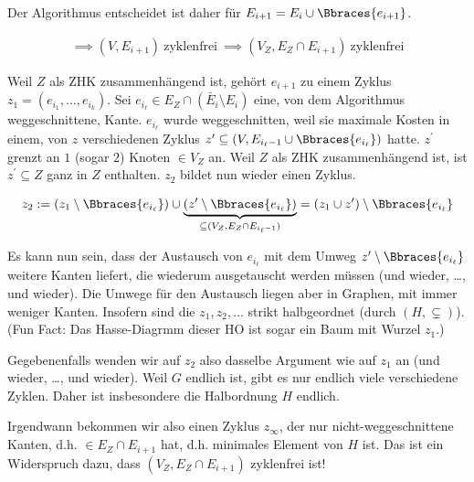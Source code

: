\begin{solution}
\begin{enumerate}[label = (\Alph*)]
\begin{enumerate}[label = \arabic*.]
\begin{enumerate}[label = 2.\arabic*.]
            Der Algorithmus entscheidet ist daher für $E_{i+1} = E_i \cup \Bbraces{e_{i+1}}$.

            \begin{align*}
                \implies
                (V, E_{i+1}) ~\text{zyklenfrei}~
                \implies
                (V_Z, E_Z \cap E_{i+1}) ~\text{zyklenfrei}
            \end{align*}

            Weil $Z$ als ZHK zusammenhängend ist, gehört $e_{i+1}$ zu einem Zyklus $z_1 = (e_{i_1}, \dots, e_{i_k})$.
            Sei $e_{i_\ell} \in E_Z \cap (\bar E_i \setminus E_i)$ eine, von dem Algorithmus weggeschnittene, Kante.
            $e_{i_\ell}$ wurde weggeschnitten, weil sie maximale Kosten in einem, von $z$ verschiedenen Zyklus $z^\prime \subseteq (V, E_{i_\ell - 1} \cup \Bbraces{e_{i_\ell}})$ hatte.
            $z^\prime$ grenzt an $1$ (sogar $2$) Knoten $\in V_Z$ an.
            Weil $Z$ als ZHK zusammenhängend ist, ist $z^\prime \subseteq Z$ ganz in $Z$ enthalten.
            $z_2$ bildet nun wieder einen Zyklus.

            \begin{align*}
                z_2
                :=
                (z_1      \setminus \Bbraces{e_{i_\ell}})
                \cup
                \underbrace
                {
                    (z^\prime \setminus \Bbraces{e_{i_\ell}})
                }_{
                    \subseteq (V_Z, E_Z \cap E_{i_\ell - 1})
                }
                =
                (z_1 \cup z^\prime) \setminus \Bbraces{e_{i_\ell}}
            \end{align*}

            Es kann nun sein, dass der Austausch von $e_{i_\ell}$ mit dem Umweg $z^\prime \setminus \Bbraces{e_{i_\ell}}$ weitere Kanten liefert, die wiederum ausgetauscht werden müssen (und wieder, \dots, und wieder).
            Die Umwege für den Austausch liegen aber in Graphen, mit immer weniger Kanten.
            Insofern sind die $z_1, z_2, \dots$ strikt halbgeordnet (durch $(H, \subsetneq)$).
            (Fun Fact: Das Hasse-Diagrmm dieser HO ist sogar ein Baum mit Wurzel $z_1$.)

            Gegebenenfalls wenden wir auf $z_2$ also dasselbe Argument wie auf $z_1$ an (und wieder, \dots, und wieder).
            Weil $G$ endlich ist, gibt es nur endlich viele verschiedene Zyklen.
            Daher ist insbesondere die Halbordnung $H$ endlich.

            Irgendwann bekommen wir also einen Zyklus $z_\infty$, der nur nicht-weggeschnittene Kanten, d.h. $\in E_Z \cap E_{i+1}$ hat, d.h. minimales Element von $H$ ist.
            Das ist ein Widerspruch dazu, dass $(V_Z, E_Z \cap E_{i+1})$ zyklenfrei ist!


\end{enumerate}
\end{enumerate}
\end{enumerate}
\end{solution}
